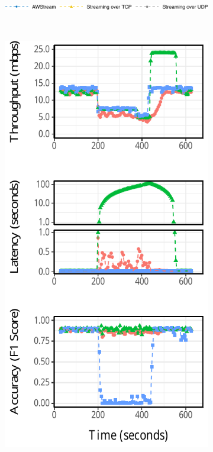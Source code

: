 \begin{figure}[!htb]
  \begin{subfigure}[t]{0.5\textwidth}
    \centering
    \includegraphics[width=\textwidth]{figures/runtime-legend.pdf}
  \end{subfigure}
  \\
  \vspace{1em}
  \begin{subfigure}[t]{0.3\textwidth}
    \centering
    \includegraphics[width=\textwidth]{figures/runtime-mot-verticle.pdf}

\end{subfigure}
\end{figure}
